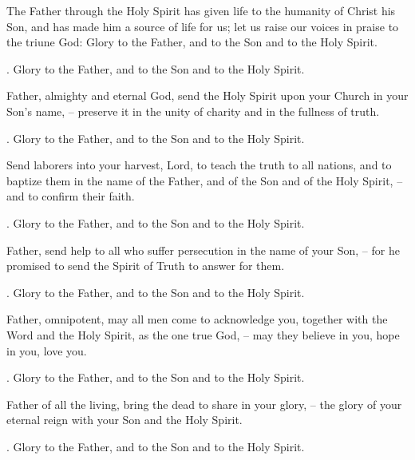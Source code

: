 \lettrine[loversize=0.15,lines=2]{T}{}he Father through the Holy Spirit has given life to the humanity of Christ his Son, and has made him a source of life for us; let us raise our voices in praise to the triune God: Glory to the Father, and to the Son and to the Holy Spirit.
\par \Rbar. Glory to the Father, and to the Son and to the Holy Spirit.

Father, almighty and eternal God, send the Holy Spirit upon your Church in your Son’s name,
– preserve it in the unity of charity and in the fullness of truth.
\par \Rbar. Glory to the Father, and to the Son and to the Holy Spirit.

Send laborers into your harvest, Lord, to teach the truth to all nations, and to baptize them in the name of the Father, and of the Son and of the Holy Spirit,
– and to confirm their faith.
\par \Rbar. Glory to the Father, and to the Son and to the Holy Spirit.

Father, send help to all who suffer persecution in the name of your Son,
– for he promised to send the Spirit of Truth to answer for them.
\par \Rbar. Glory to the Father, and to the Son and to the Holy Spirit.

Father, omnipotent, may all men come to acknowledge you, together with the Word and the Holy Spirit, as the one true God,
– may they believe in you, hope in you, love you.
\par \Rbar. Glory to the Father, and to the Son and to the Holy Spirit.

Father of all the living, bring the dead to share in your glory,
– the glory of your eternal reign with your Son and the Holy Spirit.
\par \Rbar. Glory to the Father, and to the Son and to the Holy Spirit.
